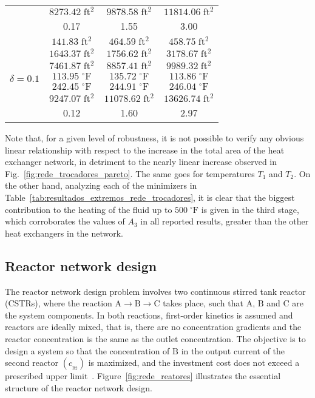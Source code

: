 \documentclass[final,5p,times,twocolumn,numbers]{elsarticle}
\begin{document}
\begin{table}[!ht]
{\begin{tabu}{cccc}
 & $ 8273.42 \; \mathrm{ft^{2}} $ & $ 9878.58 \; \mathrm{ft^{2}} $ & $ 11814.06 \; \mathrm{ft^{2}} $ \\
 & 0.17 & 1.55 & 3.00 \\ \hline
{} & $ 141.83 \; \mathrm{ft^{2}} $ & $ 464.59 \; \mathrm{ft^{2}} $ & $ 458.75 \; \mathrm{ft^{2}} $ \\
 & $ 1643.37 \; \mathrm{ft^{2}} $ & $ 1756.62 \; \mathrm{ft^{2}} $ & $ 3178.67 \; \mathrm{ft^{2}} $ \\
 & $ 7461.87 \; \mathrm{ft^{2}} $ & $ 8857.41 \; \mathrm{ft^{2}} $ & $ 9989.32 \; \mathrm{ft^{2}} $ \\
 & $ 113.95 \; \mathrm{^{\circ} F} $ & $ 135.72 \; \mathrm{^{\circ} F} $ & $ 113.86 \; \mathrm{^{\circ} F} $ \\
 & $ 242.45 \; \mathrm{^{\circ} F} $ & $ 244.91 \; \mathrm{^{\circ} F} $ & $ 246.04 \; \mathrm{^{\circ} F} $ \\ 
 & $ 9247.07 \; \mathrm{ft^{2}} $ & $ 11078.62 \; \mathrm{ft^{2}} $ & $ 13626.74 \; \mathrm{ft^{2}} $ \\
 & 0.12 & 1.60 & 2.97 \\ \hline\hline
\end{tabu}}
\end{table}

Note that, for a given level of robustness, it is not possible to verify any obvious linear relationship with respect to the increase in the total area of the heat exchanger network, in detriment to the nearly linear increase observed in Fig.~\ref{fig:rede_trocadores_pareto}. The same goes for temperatures $ T_{1} $ and $ T_{2} $. On the other hand, analyzing each of the minimizers in Table~\ref{tab:resultados_extremos_rede_trocadores}, it is clear that the biggest contribution to the heating of the fluid up to $ 500 \; \mathrm{^{\circ} F} $ is given in the third stage, which corroborates the values of $ A_{3} $ in all reported results, greater than the other heat exchangers in the network.

\subsection{Reactor network design} \label{sec:reactor_network_design}

The reactor network design problem involves two continuous stirred tank reactor (CSTRs), where the reaction $ \textrm{A} \rightarrow \textrm{B} \rightarrow \textrm{C} $ takes place, such that $ \textrm{A} $, $ \textrm{B} $ and $ \textrm{C} $ are the system components. In both reactions, first-order kinetics is assumed and reactors are ideally mixed, that is, there are no concentration gradients and the reactor concentration is the same as the outlet concentration. The objective is to design a system so that the concentration of $ \textrm{B} $ in the output current of the second reactor $ \left( c_{_{\mathrm{B} 2}} \right) $ is maximized, and the investment cost does not exceed a prescribed upper limit~\cite{bib:smith1996}. Figure~\ref{fig:rede_reatores} illustrates the essential structure of the reactor network design.
\end{document}
